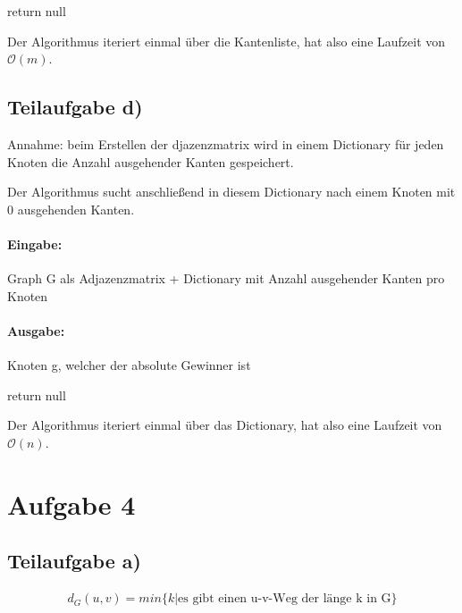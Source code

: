\documentclass[12pt]{scrartcl}%
\theoremstyle{nonumberplain}
\newcommand{\bO}[1]{\mathcal O(#1)}
\begin{document}
\begin{algorithm}
	 {
	}
	return null\;
\end{algorithm}

Der Algorithmus iteriert einmal über die Kantenliste, hat also eine Laufzeit von $\bO{m}$.

\subsection*{Teilaufgabe d)}

Annahme: beim Erstellen der djazenzmatrix wird in einem Dictionary für jeden Knoten die Anzahl ausgehender Kanten gespeichert. 

Der Algorithmus sucht anschließend in diesem Dictionary nach einem Knoten mit 0 ausgehenden Kanten.

\paragraph{Eingabe:} Graph G als Adjazenzmatrix + Dictionary mit Anzahl ausgehender Kanten pro Knoten

\paragraph{Ausgabe:} Knoten g, welcher der absolute Gewinner ist

\begin{algorithm}
	 {
	}
	return null\;
\end{algorithm}

Der Algorithmus iteriert einmal über das Dictionary, hat also eine Laufzeit von $\bO{n}$.

\newpage

\section*{Aufgabe 4}

\subsection*{Teilaufgabe a)}

\begin{align*}
	d_G(u,v) = min\{k | \text{es gibt einen u-v-Weg der länge k in G}\}
\end{align*}
\end{document}
